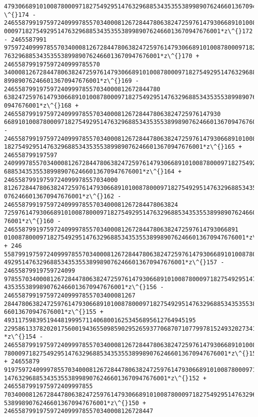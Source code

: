\documentclass[11pt]{article}
\begin{document}
\begin{tcolorbox}[breakable, size=fbox, boxrule=.5pt, pad at break*=1mm, opacityfill=0]
\begin{Verbatim}[commandchars=\\\{\}]
479306689101008780009718275492951476329688534353553899890762466013670947676001*z
\^{}174 - 2465587991975972409997855703400081267284478063824725976147930668910100878
0009718275492951476329688534353553899890762466013670947676001*z\^{}172 - 2465587991
97597240999785570340008126728447806382472597614793066891010087800097182754929514
76329688534353553899890762466013670947676001*z\^{}170 + 246558799197597240999785570
34000812672844780638247259761479306689101008780009718275492951476329688534353553
899890762466013670947676001*z\^{}169 - 24655879919759724099978557034000812672844780
63824725976147930668910100878000971827549295147632968853435355389989076246601367
0947676001*z\^{}168 + 2465587991975972409997855703400081267284478063824725976147930
6689101008780009718275492951476329688534353553899890762466013670947676001*z\^{}166
- 246558799197597240999785570340008126728447806382472597614793066891010087800097
18275492951476329688534353553899890762466013670947676001*z\^{}165 + 246558799197597
24099978557034000812672844780638247259761479306689101008780009718275492951476329
688534353553899890762466013670947676001*z\^{}164 + 24655879919759724099978557034000
81267284478063824725976147930668910100878000971827549295147632968853435355389989
0762466013670947676001*z\^{}162 - 2465587991975972409997855703400081267284478063824
72597614793066891010087800097182754929514763296885343535538998907624660136709476
76001*z\^{}160 - 246558799197597240999785570340008126728447806382472597614793066891
01008780009718275492951476329688534353553899890762466013670947676001*z\^{}158 + 246
55879919759724099978557034000812672844780638247259761479306689101008780009718275
492951476329688534353553899890762466013670947676001*z\^{}157 - 24655879919759724099
97855703400081267284478063824725976147930668910100878000971827549295147632968853
4353553899890762466013670947676001*z\^{}156 - 2465587991975972409997855703400081267
28447806382472597614793066891010087800097182754929514763296885343535538998907624
66013670947676001*z\^{}155 + 493117598395194481999571140680016253456895612764945195
22958613378202017560019436550985902952659377068707107799781524932027341895352002
*z\^{}154 - 24655879919759724099978557034000812672844780638247259761479306689101008
780009718275492951476329688534353553899890762466013670947676001*z\^{}153 + 24655879
91975972409997855703400081267284478063824725976147930668910100878000971827549295
1476329688534353553899890762466013670947676001*z\^{}152 + 2465587991975972409997855
70340008126728447806382472597614793066891010087800097182754929514763296885343535
53899890762466013670947676001*z\^{}150 + 246558799197597240999785570340008126728447

\end{Verbatim}
\end{tcolorbox}
\end{document}
